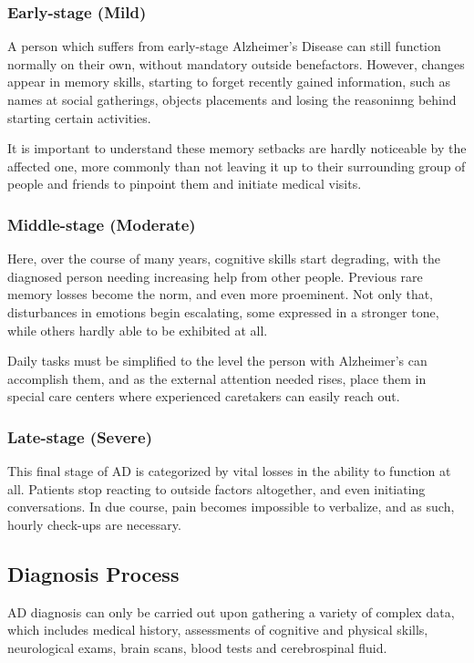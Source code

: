 \documentclass[a4paper, 12pt]{article}
\begin{document}
\subsubsection*{Early-stage (Mild)} %
A person which suffers from early-stage Alzheimer's Disease can still function normally on their own, without mandatory outside benefactors.
However, changes appear in memory skills, starting to forget recently gained information, such as names at social gatherings, objects placements
and losing the reasoninng behind starting certain activities.

It is important to understand these memory setbacks are hardly noticeable by the affected one, more commonly than not leaving it up to their
surrounding group of people and friends to pinpoint them and initiate medical visits.

\subsubsection*{Middle-stage (Moderate)} %
Here, over the course of many years, cognitive skills start degrading, with the diagnosed person needing increasing help from other people.
Previous rare memory losses become the norm, and even more proeminent. Not only that, disturbances in emotions begin escalating, some
expressed in a stronger tone, while others hardly able to be exhibited at all.

Daily tasks must be simplified to the level the person with Alzheimer's can accomplish them, and as the external attention needed rises,
place them in special care centers where experienced caretakers can easily reach out.

\subsubsection*{Late-stage (Severe)} %
This final stage of AD is categorized by vital losses in the ability to function at all. Patients stop reacting to outside factors
altogether, and even initiating conversations. In due course, pain becomes impossible to verbalize, and as such, hourly check-ups
are necessary. \cite{AA1}

\subsection{Diagnosis Process} %
AD diagnosis can only be carried out upon gathering a variety of complex data, which includes medical history, assessments of
cognitive and physical skills, neurological exams, brain scans, blood tests and cerebrospinal fluid.
\end{document}
